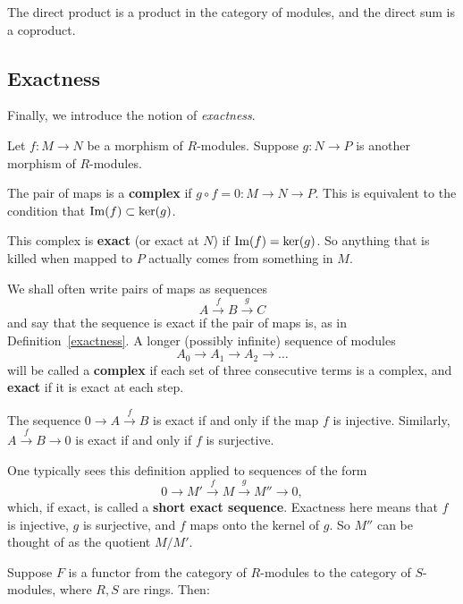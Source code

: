 \begin{exercise} 
The direct product is a product in the category of modules, and the direct sum
is a coproduct.
\end{exercise} 


\subsection{Exactness}
Finally, we introduce the notion of \emph{exactness}. 
\begin{definition} \label{exactness}
Let $f: M \to N$ be a morphism of $R$-modules.  Suppose $g: N \to P$ is another morphism of
$R$-modules.  

The pair of maps is a \textbf{complex} if $g \circ f = 0: M \to N \to P$.
This is equivalent to the condition that $\operatorname{Im}(f) \subset \ker(g)$. 

This complex is \textbf{exact} (or exact at $N$) if $\operatorname{Im}(f) = \ker(g)$. So
anything that is killed when mapped to $P$ actually comes from something in
$M$. 

\end{definition} 


We shall often write pairs of maps as sequences
\[ A \stackrel{f}{\to} B \stackrel{g}{\to} C  \]
and say that the sequence is exact if the pair of maps is, as in
Definition~\ref{exactness}. A longer (possibly infinite) sequence of modules
\[ A_0 \to A_1 \to A_2 \to \dots  \]
will be called a \textbf{complex} if each set of three
consecutive terms is a complex, and \textbf{exact} if it is exact at each step.

\begin{example} 
The sequence $0 \to A \stackrel{f}{\to} B$ is exact if and only if the map $f$
is injective. Similarly, $A \stackrel{f}{\to} B \to 0$ is exact if and only if
$f$ is surjective. 
\end{example} 

One typically sees this definition applied to sequences of the form
\[ 0 \to M'\stackrel{f}{ \to} M \stackrel{g}{\to} M'' \to 0,  \]
which, if exact, is called a \textbf{short exact sequence}. 
Exactness here means that $f$ is injective, $g$ is surjective, and $f$ maps
onto the kernel of $g$.  So $M''$ can be thought of as the quotient $M/M'$.

Suppose   $F$ is a functor from the category of $R$-modules to the
category of  $S$-modules, where $R, S$ are rings.  Then:

